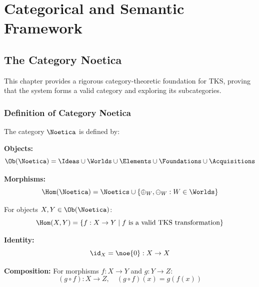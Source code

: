 
\part{Categorical and Semantic Framework}

\chapter{The Category Noetica}
\label{ch:category-noetica}

This chapter provides a rigorous category-theoretic foundation for TKS, proving that the system forms a valid category and exploring its subcategories.

\section{Definition of Category Noetica}

\begin{definition}
\label{def:category-noetica}
The category $\Noetica$ is defined by:

\textbf{Objects:}
\[
\Ob(\Noetica) = \Ideas \cup \Worlds \cup \Elements \cup \Foundations \cup \Acquisitions
\]

\textbf{Morphisms:}
\[
\Hom(\Noetica) = \Noetics \cup \{\oplus_W, \ominus_W : W \in \Worlds\}
\]

For objects $X, Y \in \Ob(\Noetica)$:
\[
\Hom(X, Y) = \{f : X \to Y \mid f \text{ is a valid TKS transformation}\}
\]

\textbf{Identity:}
\[
\id_X = \noe{0} : X \to X
\]

\textbf{Composition:}
For morphisms $f : X \to Y$ and $g : Y \to Z$:
\[
(g \circ f) : X \to Z, \quad (g \circ f)(x) = g(f(x))
\]
\end{definition}

